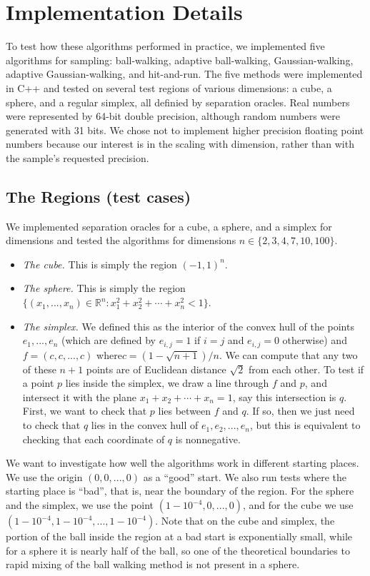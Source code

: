 \documentclass[11pt]{article}
\begin{document}
\section{Implementation Details}

To test how these algorithms performed in practice, we implemented five algorithms for sampling: ball-walking, adaptive ball-walking, Gaussian-walking, adaptive Gaussian-walking, and hit-and-run. The five methods were implemented in C++ and tested on several test regions of various dimensions: a cube, a sphere, and a regular simplex, all definied by separation oracles. Real numbers were represented by 64-bit double precision, although random numbers were generated with 31 bits. We chose not to implement higher precision floating point numbers because our interest is in the scaling with dimension, rather than with the sample's requested precision.

\subsection{The Regions (test cases)}

We implemented separation oracles for a cube, a sphere, and a simplex for dimensions and tested the algorithms for dimensions $n\in\{2,3,4,7,10,100\}$.
\begin{itemize}
\item \emph{The cube.} This is simply the region $(-1,1)^n$.
\item \emph{The sphere.} This is simply the region $\{(x_1,...,x_n)\in\mathbb{R}^n : x_1^2 + x_2^2 + \cdots + x_n^2 < 1\}$.
\item \emph{The simplex.} We defined this as the interior of the convex hull of the points $e_1, ..., e_n$ (which are defined by $e_{i,j} = 1$ if $i=j$ and $e_{i,j} = 0$ otherwise) and $f = (c,c,...,c)$ where\linebreak $c = (1 - \sqrt{n + 1}) / n$. We can compute that any two of these $n+1$ points are of Euclidean distance $\sqrt{2}$ from each other. To test if a point $p$ lies inside the simplex, we draw a line through $f$ and $p$, and intersect it with the plane $x_1 + x_2 + \cdots + x_n = 1$, say this intersection is $q$. First, we want to check that $p$ lies between $f$ and $q$. If so, then we just need to check that $q$ lies in the convex hull of $e_1,e_2,...,e_n$, but this is equivalent to checking that each coordinate of $q$ is nonnegative.
\end{itemize}

We want to investigate how well the algorithms work in different starting places. We use the origin $(0,0,...,0)$ as a ``good'' start. We also run tests where the starting place is ``bad'', that is, near the boundary of the region. For the sphere and the simplex, we use the point $(1 - 10^{-4}, 0, ..., 0)$, and for the cube we use $(1 - 10^{-4}, 1 - 10^{-4}, ..., 1 - 10^{-4})$. Note that on the cube and simplex, the portion of the ball inside the region at a bad start is exponentially small, while for a sphere it is nearly half of the ball, so one of the theoretical boundaries to rapid mixing of the ball walking method is not present in a sphere.
\end{document}
